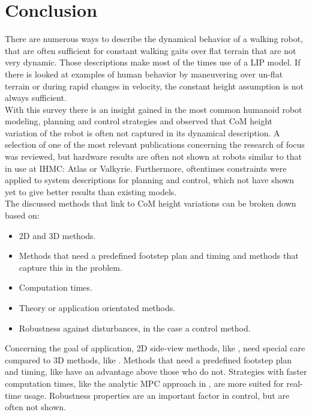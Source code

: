 %
\chapter{Conclusion}%
\label{chap:conclusion}
There are numerous ways to describe the dynamical behavior of a walking robot, that are often sufficient for constant walking gaits over flat terrain that are not very dynamic. Those descriptions make most of the times use of a \ac{LIP} model. If there is looked at examples of human behavior by maneuvering over un-flat terrain or during rapid changes in velocity, the constant height assumption is not always sufficient. \\
With this survey there is an insight gained in the most common humanoid robot modeling, planning and control strategies and observed that \ac{CoM} height variation of the robot is often not captured in its dynamical description. A selection of one of the most relevant publications concerning the research of focus was reviewed, but hardware results are often not shown at robots similar to that in use at IHMC: Atlas or Valkyrie. Furthermore, oftentimes constraints were applied to system descriptions for planning and control, which not have shown yet to give better results than existing models.\\
The discussed methods that link to \ac{CoM} height variations can be broken down based on:
\begin{itemize}
\item \ac{2D} and \ac{3D} methods.
\item Methods that need a predefined footstep plan and timing and methods that capture this in the problem.
\item Computation times.
\item Theory or application orientated methods.
\item Robustness against disturbances, in the case a control method.
\end{itemize}
Concerning the goal of application, \ac{2D} side-view methods, like \cite{pratt2007derivation, koolen2016balance, gao2017increase, nguyen2017dynamic}, need special care compared to \ac{3D} methods, like \cite{englsberger2013three, hopkins2014humanoid, liu2015trajectory, caron2018capturability}. Methods that need a predefined footstep plan and timing, like  \cite{englsberger2013three, hopkins2014humanoid,  caron2018capturability} have an advantage above those who do not. Strategies with faster computation times, like the analytic \ac{MPC} approach in \cite{koolen2016balance}, are more suited for real-time usage. Robustness properties are an important factor in control, but are often not shown.\\
